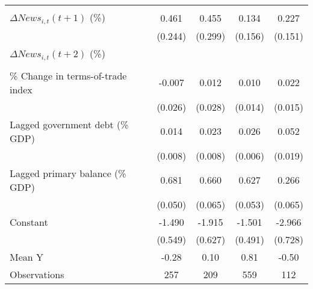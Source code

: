 {\begin{tabular}{l*{4}{c}}
                    &                     &                     &                     &                     \\
\addlinespace
$ \Delta News_{i,t}(t+1)$ (\%)&       0.461\sym{*}  &       0.455         &       0.134         &       0.227         \\
                    &     (0.244)         &     (0.299)         &     (0.156)         &     (0.151)         \\
\addlinespace
$ \Delta News_{i,t}(t+2)$ (\%)&                     &                     &                     &                     \\
                    &                     &                     &                     &                     \\
\addlinespace
\% Change in terms-of-trade index&      -0.007         &       0.012         &       0.010         &       0.022         \\
                    &     (0.026)         &     (0.028)         &     (0.014)         &     (0.015)         \\
\addlinespace
Lagged government debt (\% GDP)&       0.014\sym{*}  &       0.023\sym{**} &       0.026\sym{***}&       0.052\sym{**} \\
                    &     (0.008)         &     (0.008)         &     (0.006)         &     (0.019)         \\
\addlinespace
Lagged primary balance (\% GDP)&       0.681\sym{***}&       0.660\sym{***}&       0.627\sym{***}&       0.266\sym{***}\\
                    &     (0.050)         &     (0.065)         &     (0.053)         &     (0.065)         \\
\addlinespace
Constant            &      -1.490\sym{**} &      -1.915\sym{**} &      -1.501\sym{***}&      -2.966\sym{***}\\
                    &     (0.549)         &     (0.627)         &     (0.491)         &     (0.728)         \\
\midrule
Mean Y              &       -0.28         &        0.10         &        0.81         &       -0.50         \\
Observations        &         257         &         209         &         559         &         112         \\
\bottomrule
\end{tabular}
}
